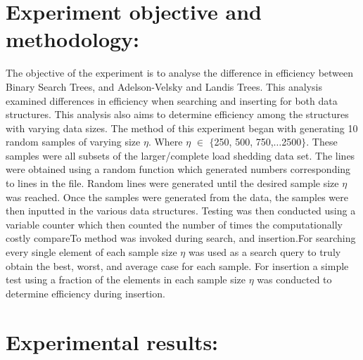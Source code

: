 \documentclass[10pt, a4paper]{article}
\begin{document}
    \section{Experiment objective and methodology:}
        The objective of the experiment is to analyse the difference in efficiency between Binary Search Trees, 
        and Adelson-Velsky and Landis Trees. This analysis examined differences in efficiency when searching and 
        inserting for both data structures. This analysis also aims to determine efficiency among the structures 
        with varying data sizes. The method of this experiment began with generating 10 random samples of varying size 
        $\eta$. Where $\eta$ $\in$ $\lbrace$250, 500,  750,$\dots$2500$\rbrace$. These samples were all subsets of the 
        larger/complete load shedding data set. The lines were obtained using a random function which generated numbers 
        corresponding to lines in the file. Random lines were generated until the desired sample size $\eta$ was reached.
        \newline
        \newline
        Once the samples were generated from the data, the samples were then inputted in the various data structures.
        Testing was then conducted using a variable counter which then counted the number of times the computationally
        costly compareTo method was invoked during search, and insertion.For searching every single element of each 
        sample size $\eta$ was used as a search query to truly obtain the best, worst, and average case for each sample.
        For insertion a simple test using a fraction of the elements in each sample size $\eta$ was conducted to 
        determine efficiency during insertion.
        
        \section{Experimental results:}
\end{document}
